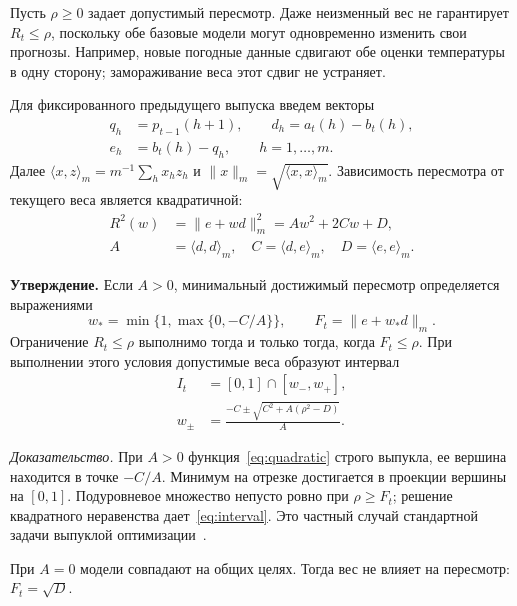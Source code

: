 \documentclass{misisarticle}
\begin{document}
Пусть $\rho\geq0$ задает допустимый пересмотр. Даже неизменный вес не гарантирует $R_t\leq\rho$, поскольку обе базовые модели могут одновременно изменить свои прогнозы. Например, новые погодные данные сдвигают обе оценки температуры в одну сторону; замораживание веса этот сдвиг не устраняет.

Для фиксированного предыдущего выпуска введем векторы
\begin{equation}
 \begin{aligned}
 q_h&=p_{t-1}(h+1),\qquad d_h=a_t(h)-b_t(h),\\
 e_h&=b_t(h)-q_h,\qquad h=1,\ldots,m.
 \end{aligned}
 \label{eq:vectors}
\end{equation}
Далее $\langle x,z\rangle_m=m^{-1}\sum_hx_hz_h$ и
$\|x\|_m=\sqrt{\langle x,x\rangle_m}$. Зависимость пересмотра от текущего веса является квадратичной:
\begin{equation}
 \begin{aligned}
 R^2(w)&=\|e+wd\|_m^2=Aw^2+2Cw+D,\\
 A&=\langle d,d\rangle_m,\quad
 C=\langle d,e\rangle_m,\quad D=\langle e,e\rangle_m.
 \end{aligned}
 \label{eq:quadratic}
\end{equation}

\textbf{Утверждение.} Если $A>0$, минимальный достижимый пересмотр определяется выражениями
\begin{equation}
 w_*=\min\{1,\max\{0,-C/A\}\},\qquad
 F_t=\|e+w_*d\|_m.
 \label{eq:floor}
\end{equation}
Ограничение $R_t\leq\rho$ выполнимо тогда и только тогда, когда $F_t\leq\rho$. При выполнении этого условия допустимые веса образуют интервал
\begin{equation}
 \begin{aligned}
 I_t&=[0,1]\cap[w_-,w_+],\\
 w_\pm&=\frac{-C\pm\sqrt{C^2+A(\rho^2-D)}}{A}.
 \end{aligned}
 \label{eq:interval}
\end{equation}

\textit{Доказательство.} При $A>0$ функция~\eqref{eq:quadratic} строго выпукла, ее вершина находится в точке $-C/A$. Минимум на отрезке достигается в проекции вершины на $[0,1]$. Подуровневое множество непусто ровно при $\rho\geq F_t$; решение квадратного неравенства дает~\eqref{eq:interval}. Это частный случай стандартной задачи выпуклой оптимизации~\cite{boyd2004}.

При $A=0$ модели совпадают на общих целях. Тогда вес не влияет на пересмотр: $F_t=\sqrt D$.
\end{document}
